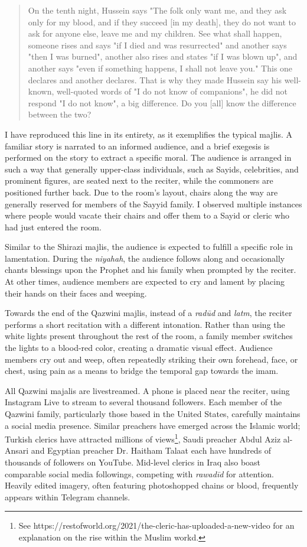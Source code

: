 \begin{quote}
On the tenth night, Hussein says "The folk only want me, and they ask only for my blood, and if they succeed [in my death], they do not want to ask for anyone else, leave me and my children. See what shall happen, someone rises and says "if I died and was resurrected" and another says "then I was burned", another also rises and states "if I was blown up", and another says "even if something happens, I shall not leave you." This one declares and another declares. That is why they made Hussein say his well-known, well-quoted words of "I do not know of companions", he did not respond "I do not know", a big difference. Do you [all] know the difference between the two?
\end{quote}

I have reproduced this line in its entirety, as it exemplifies the typical majlis. A familiar story is narrated to an informed audience, and a brief exegesis is performed on the story to extract a specific moral. The audience is arranged in such a way that generally upper-class individuals, such as Sayids, celebrities, and prominent figures, are seated next to the reciter, while the commoners are positioned further back. Due to the room's layout, chairs along the way are generally reserved for members of the Sayyid family. I observed multiple instances where people would vacate their chairs and offer them to a Sayid or cleric who had just entered the room.

Similar to the Shirazi majlis, the audience is expected to fulfill a specific role in lamentation. During the \emph{niyahah}, the audience follows along and occasionally chants blessings upon the Prophet and his family when prompted by the reciter. At other times, audience members are expected to cry and lament by placing their hands on their faces and weeping.

Towards the end of the Qazwini majlis, instead of a \emph{radūd} and \emph{latm}, the reciter performs a short recitation with a different intonation. Rather than using the white lights present throughout the rest of the room, a family member switches the lights to a blood-red color, creating a dramatic visual effect. Audience members cry out and weep, often repeatedly striking their own forehead, face, or chest, using pain as a means to bridge the temporal gap towards the imam.

All Qazwini majalis are livestreamed. A phone is placed near the reciter, using Instagram Live to stream to several thousand followers. Each member of the Qazwini family, particularly those based in the United States, carefully maintains a social media presence. Similar preachers have emerged across the Islamic world; Turkish clerics have attracted millions of views\footnote{See https://restofworld.org/2021/the-cleric-has-uploaded-a-new-video for an explanation on the rise within the Muslim workd.}, Saudi preacher Abdul Aziz al-Ansari and Egyptian preacher Dr. Haitham Talaat each have hundreds of thousands of followers on YouTube. Mid-level clerics in Iraq also boast comparable social media followings, competing with \emph{rawadīd} for attention. Heavily edited imagery, often featuring photoshopped chains or blood, frequently appears within Telegram channels.

